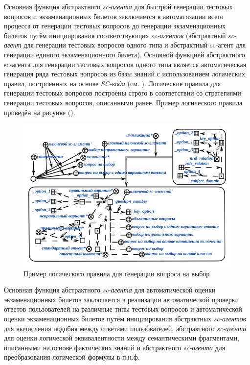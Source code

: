 Основная функция абстрактного \textit{sc-агента} для быстрой генерации тестовых вопросов и экзаменационных билетов заключается в автоматизации всего процесса от генерации тестовых вопросов до генерации экзаменационных билетов путём инициирования соответствующих \textit{sc-агентов} (абстрактный \textit{sc-агент} для генерации тестовых вопросов одного типа и абстрактный sc-агент для генерации единого экзаменационного билета). Основной функцией абстрактного sc-агента для генерации тестовых вопросов одного типа является автоматическая генерация ряда тестовых вопросов из базы знаний с использованием логических правил, построенных на основе \textit{SC-кода} (см. ). Логические правила для генерации тестовых вопросов построены строго в соответствии со стратегиями генерации тестовых вопросов, описанными ранее. Пример логического правила приведён на рисунке (\textit{}).

\begin{figure}[H]
	\includegraphics[scale=1]{author/part7/figures/logic_rule_example.png}
	\caption{Пример логического правила для генерации вопроса на выбор}
	\label{fig:LRE_example}
\end{figure}

Основная функция абстрактного \textit{sc-агента} для автоматической оценки экзаменационных билетов заключается в реализации автоматической проверки ответов пользователей на различные типы тестовых вопросов и автоматической оценки экзаменационных билетов путём инициирования абстрактных \textit{sc-агентов} для вычисления подобия между ответами пользователей, абстрактного \textit{sc-агента} для оценки логической эквивалентности между семантическими фрагментами, описанными на основе фактических знаний и абстрактного \textit{sc-агента} для преобразования логической формулы в п.н.ф.